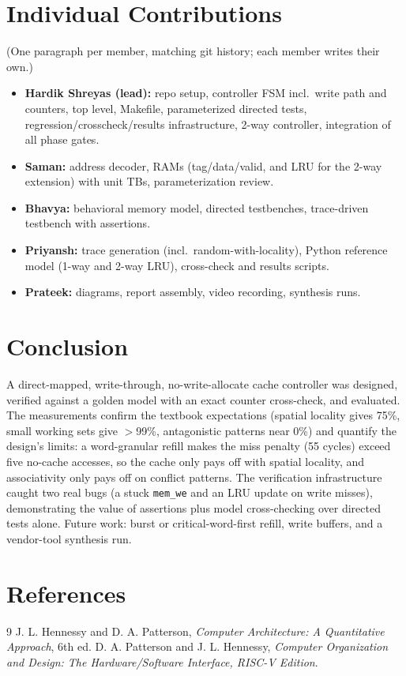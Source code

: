 \documentclass[conference]{IEEEtran}
\begin{document}
\section{Individual Contributions}
(One paragraph per member, matching git history; each member writes their
own.)
\begin{itemize}
  \item \textbf{Hardik Shreyas (lead):} repo setup, controller FSM incl.\
        write path and counters, top level, Makefile, parameterized directed
        tests, regression/crosscheck/results infrastructure, 2-way
        controller, integration of all phase gates.
  \item \textbf{Saman:} address decoder, RAMs (tag/data/valid, and LRU for
        the 2-way extension) with unit TBs, parameterization review.
  \item \textbf{Bhavya:} behavioral memory model, directed testbenches,
        trace-driven testbench with assertions.
  \item \textbf{Priyansh:} trace generation (incl.\ random-with-locality),
        Python reference model (1-way and 2-way LRU), cross-check and
        results scripts.
  \item \textbf{Prateek:} diagrams, report assembly, video recording,
        synthesis runs.
\end{itemize}

\section{Conclusion}
A direct-mapped, write-through, no-write-allocate cache controller was
designed, verified against a golden model with an exact counter cross-check,
and evaluated. The measurements confirm the textbook expectations (spatial
locality gives 75\%, small working sets give $>$99\%, antagonistic patterns
near 0\%) and quantify the design's limits: a word-granular refill makes the
miss penalty (55 cycles) exceed five no-cache accesses, so the cache only
pays off with spatial locality, and associativity only pays off on conflict
patterns. The verification infrastructure caught two real bugs (a stuck
\texttt{mem\_we} and an LRU update on write misses), demonstrating the value
of assertions plus model cross-checking over directed tests alone. Future
work: burst or critical-word-first refill, write buffers, and a vendor-tool
synthesis run.

\section{References}
\begin{thebibliography}{9}
 J. L. Hennessy and D. A. Patterson, \emph{Computer Architecture:
  A Quantitative Approach}, 6th ed.
 D. A. Patterson and J. L. Hennessy, \emph{Computer Organization
  and Design: The Hardware/Software Interface, RISC-V Edition}.
\end{thebibliography}
\end{document}
